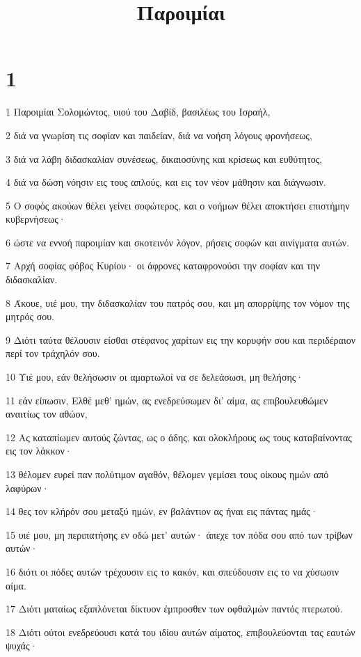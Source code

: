 

\title{Παροιμίαι}


\chapter{1}

\par 1 Παροιμίαι Σολομώντος, υιού του Δαβίδ, βασιλέως του Ισραήλ,
\par 2 διά να γνωρίση τις σοφίαν και παιδείαν, διά να νοήση λόγους φρονήσεως,
\par 3 διά να λάβη διδασκαλίαν συνέσεως, δικαιοσύνης και κρίσεως και ευθύτητος,
\par 4 διά να δώση νόησιν εις τους απλούς, και εις τον νέον μάθησιν και διάγνωσιν.
\par 5 Ο σοφός ακούων θέλει γείνει σοφώτερος, και ο νοήμων θέλει αποκτήσει επιστήμην κυβερνήσεως·
\par 6 ώστε να εννοή παροιμίαν και σκοτεινόν λόγον, ρήσεις σοφών και αινίγματα αυτών.
\par 7 Αρχή σοφίας φόβος Κυρίου· οι άφρονες καταφρονούσι την σοφίαν και την διδασκαλίαν.
\par 8 Άκουε, υιέ μου, την διδασκαλίαν του πατρός σου, και μη απορρίψης τον νόμον της μητρός σου.
\par 9 Διότι ταύτα θέλουσιν είσθαι στέφανος χαρίτων εις την κορυφήν σου και περιδέραιον περί τον τράχηλόν σου.
\par 10 Υιέ μου, εάν θελήσωσιν οι αμαρτωλοί να σε δελεάσωσι, μη θελήσης·
\par 11 εάν είπωσιν, Ελθέ μεθ' ημών, ας ενεδρεύσωμεν δι' αίμα, ας επιβουλευθώμεν αναιτίως τον αθώον,
\par 12 Ας καταπίωμεν αυτούς ζώντας, ως ο άδης, και ολοκλήρους ως τους καταβαίνοντας εις τον λάκκον·
\par 13 θέλομεν ευρεί παν πολύτιμον αγαθόν, θέλομεν γεμίσει τους οίκους ημών από λαφύρων·
\par 14 θες τον κλήρόν σου μεταξύ ημών, εν βαλάντιον ας ήναι εις πάντας ημάς·
\par 15 υιέ μου, μη περιπατήσης εν οδώ μετ' αυτών· άπεχε τον πόδα σου από των τρίβων αυτών·
\par 16 διότι οι πόδες αυτών τρέχουσιν εις το κακόν, και σπεύδουσιν εις το να χύσωσιν αίμα.
\par 17 Διότι ματαίως εξαπλόνεται δίκτυον έμπροσθεν των οφθαλμών παντός πτερωτού.
\par 18 Διότι ούτοι ενεδρεύουσι κατά του ιδίου αυτών αίματος, επιβουλεύονται τας εαυτών ψυχάς·
